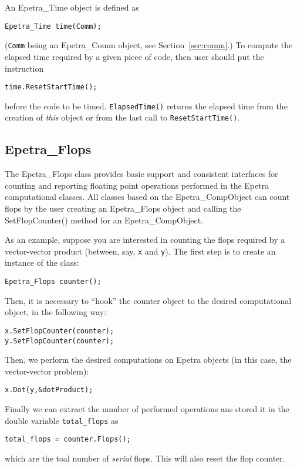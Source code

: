 An Epetra\_Time object is defined as
\begin{verbatim}
Epetra_Time time(Comm);
\end{verbatim}
(\verb!Comm! being an Epetra\_Comm object, see Section~\ref{sec:comm}.)
To compute the elapsed time required by a given piece of code, then user
should put the instruction
\begin{verbatim}
time.ResetStartTime();
\end{verbatim}
before the code to be timed. \verb!ElapsedTime()!  returns the elapsed
time from the creation of {\sl this} object or from the last call to
\verb!ResetStartTime()!.


\subsection{Epetra\_Flops}
\label{sec:flops}

The Epetra\_Flops class provides basic support and consistent interfaces
for counting and reporting floating point operations performed in the
Epetra computational classes. All classes based on the
Epetra\_CompObject can count flops by the user creating an Epetra\_Flops
object and calling the SetFlopCounter() method for an
Epetra\_CompObject.

As an example, suppose you are interested in counting the flops required
by a vector-vector product (between, say, \verb!x! and \verb!y!).  The
first step is to create an instance of the class:
\begin{verbatim}
Epetra_Flops counter();
\end{verbatim}
Then, it is necessary to ``hook'' the counter object to the desired
computational object, in the following way:
\begin{verbatim}
x.SetFlopCounter(counter);
y.SetFlopCounter(counter);
\end{verbatim}
Then, we perform the desired computations on Epetra objects (in this
case, the vector-vector problem):
\begin{verbatim}
x.Dot(y,&dotProduct);
\end{verbatim}
Finally we can extract the number of performed operations ans stored it
in the double variable \verb!total_flops! as
\begin{verbatim}
total_flops = counter.Flops();
\end{verbatim}
which are the toal number of {\sl serial} flops. This will also reset
the flop counter.


